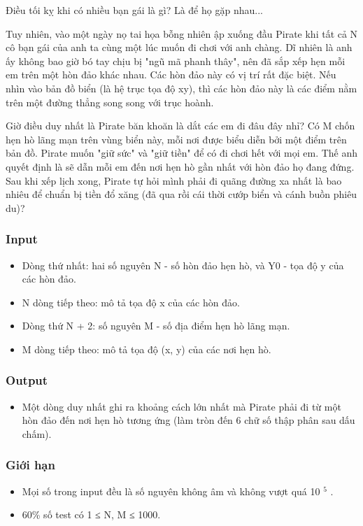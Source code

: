 



   Điều tối kỵ khi có nhiều bạn gái là gì? Là để họ gặp nhau...  

   Tuy nhiên, vào một ngày nọ tai họa bỗng nhiên ập xuống đầu Pirate khi tất cả N cô bạn gái của anh ta cùng một lúc muốn đi chơi với anh chàng. Dĩ nhiên là anh ấy không bao giờ bó tay chịu bị "ngũ mã phanh thây", nên đã sắp xếp hẹn mỗi em trên một hòn đảo khác nhau. Các hòn đảo này có vị trí rất đặc biệt. Nếu nhìn vào bản đồ biển (là hệ trục tọa độ xy), thì các hòn đảo này là các điểm nằm trên một đường thẳng song song với trục hoành.  

   Giờ điều duy nhất là Pirate băn khoăn là dắt các em đi đâu đây nhỉ? Có M chốn hẹn hò lãng mạn trên vùng biển này, mỗi nơi được biểu diễn bởi một điểm trên bản đồ. Pirate muốn "giữ sức" và "giữ tiền" để có đi chơi hết với mọi em. Thế anh quyết định là sẽ dẫn mỗi em đến nơi hẹn hò gần nhất với hòn đảo họ đang đứng. Sau khi xếp lịch xong, Pirate tự hỏi mình phải đi quãng đường xa nhất là bao nhiêu để chuẩn bị tiền đổ xăng (đã qua rồi cái thời cướp biển và cánh buồn phiêu du)?  

\subsubsection{   Input  }
\begin{itemize}
	\item     Dòng thứ nhất: hai số nguyên N - số hòn đảo hẹn hò, và Y0 - tọa độ y của các hòn đảo.   
	\item     N dòng tiếp theo: mô tả tọa độ x của các hòn đảo.   
	\item     Dòng thứ N + 2: số nguyên M - số địa điểm hẹn hò lãng mạn.   
	\item     M dòng tiếp theo: mô tả tọa độ (x, y) của các nơi hẹn hò.   
\end{itemize}

\subsubsection{   Output  }
\begin{itemize}
	\item     Một dòng duy nhất ghi ra khoảng cách lớn nhất mà Pirate phải đi từ một hòn đảo đến nơi hẹn hò tương ứng (làm tròn đến 6 chữ số thập phân sau dấu chấm).   
\end{itemize}

\subsubsection{   Giới hạn  }
\begin{itemize}
	\item     Mọi số trong input đều là số nguyên không âm và không vượt quá 10    $^     5    $    .   
	\item     60\% số test có 1 ≤ N, M ≤ 1000.   
\end{itemize}

